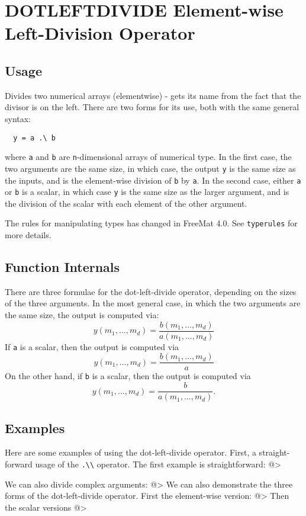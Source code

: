 \section{DOTLEFTDIVIDE Element-wise Left-Division Operator}

\subsection{Usage}

Divides two numerical arrays (elementwise) - gets its name from the 
fact that the divisor is on the left.  There are two forms
for its use, both with the same general syntax:
\begin{verbatim}
  y = a .\ b
\end{verbatim}
where \verb|a| and \verb|b| are \verb|n|-dimensional arrays of numerical type.  In the
first case, the two arguments are the same size, in which case, the 
output \verb|y| is the same size as the inputs, and is the element-wise
division of \verb|b| by \verb|a|.  In the second case, either \verb|a| or \verb|b| is a scalar, 
in which case \verb|y| is the same size as the larger argument,
and is the division of the scalar with each element of the other argument.

The rules for manipulating types has changed in FreeMat 4.0.  See \verb|typerules|
for more details.

\subsection{Function Internals}

There are three formulae for the dot-left-divide operator, depending on the
sizes of the three arguments.  In the most general case, in which 
the two arguments are the same size, the output is computed via:
\[
y(m_1,\ldots,m_d) = \frac{b(m_1,\ldots,m_d)}{a(m_1,\ldots,m_d)}
\]
If \verb|a| is a scalar, then the output is computed via
\[
y(m_1,\ldots,m_d) = \frac{b(m_1,\ldots,m_d)}{a}
\]
On the other hand, if \verb|b| is a scalar, then the output is computed via
\[
y(m_1,\ldots,m_d) = \frac{b}{a(m_1,\ldots,m_d)}.
\]
\subsection{Examples}

Here are some examples of using the dot-left-divide operator.  First, a 
straight-forward usage of the \verb|.\\| operator.  The first example
is straightforward:
@>

We can also divide complex arguments:
@>
We can also demonstrate the three forms of the dot-left-divide operator.  First
the element-wise version:
@>
Then the scalar versions
@>
